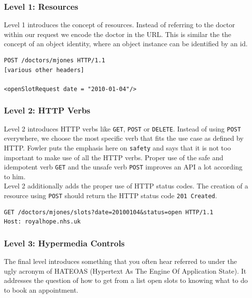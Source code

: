 \subsubsection{Level 1: Resources}

Level 1 introduces the concept of resources. Instead of referring to the doctor within our request we encode the doctor in the URL. This is similar the the concept of an object identity, where an object instance can be identified by an id.

\lstset{language=XML}
\begin{lstlisting}[caption=Level 1: Referring to the doctor as a resource.]
POST /doctors/mjones HTTP/1.1
[various other headers]

<openSlotRequest date = "2010-01-04"/>
\end{lstlisting}

\subsubsection{Level 2: HTTP Verbs}

Level 2 introduces HTTP verbs like \lstinline{GET}, \lstinline{POST} or \lstinline{DELETE}. Instead of using \lstinline{POST} everywhere, we choose the most specific verb that fits the use case as defined by HTTP.
Fowler puts the emphasis here on \lstinline{safety} and says that it is not too important to make use of all the HTTP verbs. Proper use of the safe and idempotent verb \lstinline{GET} and the unsafe verb \lstinline{POST} improves an API a lot according to him. \\
Level 2 additionally adds the proper use of HTTP status codes. The creation of a resource using \lstinline{POST} should return the HTTP status code \lstinline{201 Created}.

\lstset{language=}
\begin{lstlisting}[caption=Level 2: Safely fetching the list of open slots using \lstinline{GET}.]
GET /doctors/mjones/slots?date=20100104&status=open HTTP/1.1
Host: royalhope.nhs.uk
\end{lstlisting}

\subsubsection{Level 3: Hypermedia Controls}

The final level introduces something that you often hear referred to under the ugly acronym of HATEOAS (Hypertext As The Engine Of Application State). It addresses the question of how to get from a list open slots to knowing what to do to book an appointment. \citep{rmm}

